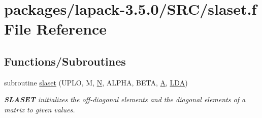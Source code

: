 \hypertarget{slaset_8f}{}\section{packages/lapack-\/3.5.0/\+S\+R\+C/slaset.f File Reference}
\label{slaset_8f}
\subsection*{Functions/\+Subroutines}
\begin{DoxyCompactItemize}
\item 
subroutine \hyperlink{group__auxOTHERauxiliary_ga6174184453f17ad7cc3488044325d5ac}{slaset} (U\+P\+L\+O, M, \hyperlink{polmisc_8c_a0240ac851181b84ac374872dc5434ee4}{N}, A\+L\+P\+H\+A, B\+E\+T\+A, \hyperlink{classA}{A}, \hyperlink{example__user_8c_ae946da542ce0db94dced19b2ecefd1aa}{L\+D\+A})
\begin{DoxyCompactList}\small\item\em {\bfseries S\+L\+A\+S\+E\+T} initializes the off-\/diagonal elements and the diagonal elements of a matrix to given values. \end{DoxyCompactList}\end{DoxyCompactItemize}

